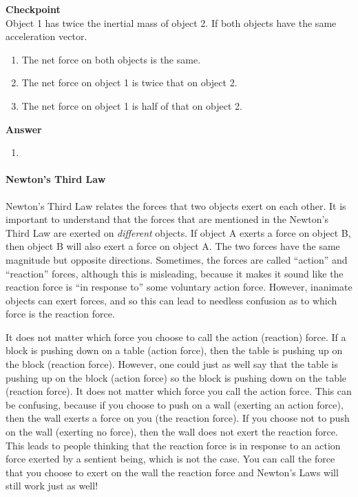 \begin{framed}
\textbf{Checkpoint}\\
Object 1 has twice the inertial mass of object 2. If both objects have the same acceleration vector.

\begin{enumerate}
\item The net force on both objects is the same.
\item The net force on object 1 is twice that on object 2.
\item The net force on object 1 is half of that on object 2.
\end{enumerate}

\begin{framed}
\textbf{Answer}\\
\begin{enumerate}[resume]
\item
\end{enumerate}
\end{framed}
\end{framed}

\paragraph{Newton's Third Law}

Newton's Third Law relates the forces that two objects exert on each other. It is important to understand that the forces that are mentioned in the Newton's Third Law are exerted on \textit{different} objects. If object A exerts a force on object B, then object B will also exert a force on object A. The two forces have the same magnitude but opposite directions. Sometimes, the forces are called ``action'' and ``reaction'' forces, although this is misleading, because it makes it sound like the reaction force is ``in response to'' some voluntary action force. However, inanimate objects can exert forces, and so this can lead to needless confusion as to which force is the reaction force.

It does not matter which force you choose to call the action (reaction) force. If a block is pushing down on a table (action force), then the table is pushing up on the block (reaction force). However, one could just as well say that the table is pushing up on the block (action force) so the block is pushing down on the table (reaction force). It does not matter which force you call the action force. This can be confusing, because if you choose to push on a wall (exerting an action force), then the wall exerts a force on you (the reaction force). If you choose not to push on the wall (exerting no force), then the wall does not exert the reaction force. This leads to people thinking that the reaction force is in response to an action force exerted by a sentient being, which is not the case. You can call the force that you choose to exert on the wall the reaction force and Newton's Laws will still work just as well!

